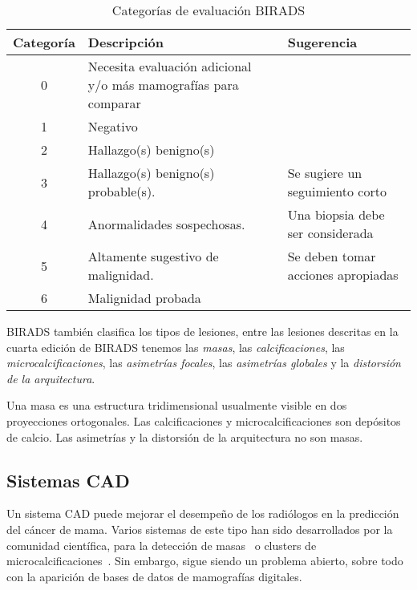 \begin{table}
  \caption[Categorías de evaluación BIRADS]{Categorías de evaluación BIRADS}
  \label{birads}
\begin{center}
{\scriptsize
    \begin{tabular}{c | >{\centering\arraybackslash}m{1.8in} |
    >{\centering\arraybackslash}m{1.8in} }
    \hline
    {\bf Categoría} & 
    {\bf Descripción} &
    {\bf Sugerencia} \\
    \hline
    0 & Necesita evaluación adicional y/o más mamografías para comparar&\\
    1 & Negativo&\\
    2 & Hallazgo(s) benigno(s)&\\
    3 & Hallazgo(s) benigno(s) probable(s). & Se sugiere un seguimiento corto\\
    4 & Anormalidades sospechosas. & Una biopsia debe ser considerada \\
    5 & Altamente sugestivo de malignidad. & Se deben tomar acciones apropiadas\\
    6 & Malignidad probada&\\
    \hline
    \end{tabular}
}
\end{center}
\end{table}

BIRADS también clasifica los tipos de lesiones, entre las lesiones descritas en
la cuarta edición de BIRADS tenemos las \textit{masas}, las
\textit{calcificaciones}, las \textit{microcalcificaciones}, las
\textit{asimetrías focales}, las \textit{asimetrías globales} y la
\textit{distorsión de la arquitectura}. 

Una masa es una estructura tridimensional usualmente visible en dos
proyecciones ortogonales. Las calcificaciones y microcalcificaciones son
depósitos de calcio. Las asimetrías y la distorsión de la arquitectura no son
masas.

\subsection{Sistemas CAD}

Un sistema CAD puede mejorar el desempeño de los radiólogos en la predicción
del cáncer de mama. Varios sistemas de este tipo han sido desarrollados por la
comunidad científica, para la detección de masas~\cite{bellotti2006completely}
o clusters de microcalcificaciones~\cite{yu2000cad}. Sin embargo, sigue siendo
un problema abierto, sobre todo con la aparición de bases de datos de
mamografías digitales.

